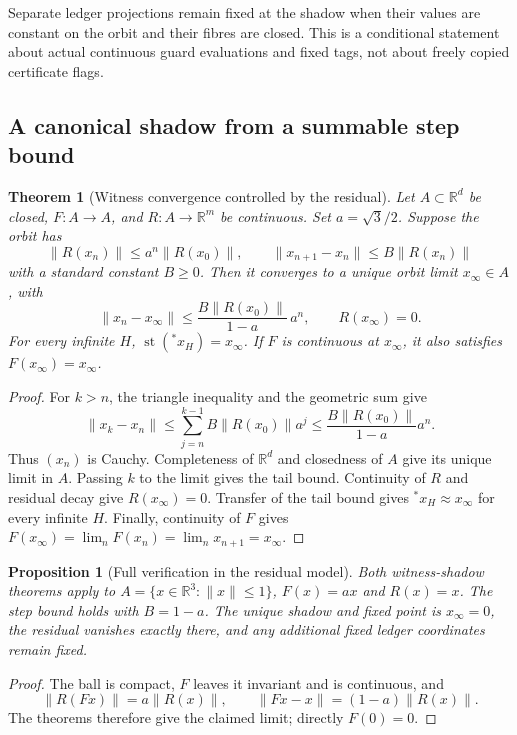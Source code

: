 \documentclass[11pt,a4paper]{article}
\newtheorem{proposition}{Proposition}
\newtheorem{theorem}{Theorem}
\begin{document}
Separate ledger projections remain fixed at the shadow when their values
are constant on the orbit and their fibres are closed. This is a conditional
statement about actual continuous guard evaluations and fixed tags, not
about freely copied certificate flags.

\subsection{A canonical shadow from a summable step bound}
\begin{theorem}[Witness convergence controlled by the residual]
\label{thm:canonical-witness-shadow}
Let $A\subset\mathbb R^d$ be closed, $F:A\to A$, and $R:A\to\mathbb R^m$
be continuous. Set $a=\sqrt3/2$. Suppose the orbit has
\[
\|R(x_n)\|\le a^n\|R(x_0)\|,
\qquad \|x_{n+1}-x_n\|\le B\|R(x_n)\|
\]
with a standard constant $B\ge0$. Then it converges to a unique orbit
limit $x_\infty\in A$, with
\[
\|x_n-x_\infty\|
\le\frac{B\|R(x_0)\|}{1-a}\,a^n,
\qquad R(x_\infty)=0.
\]
For every infinite $H$, $\operatorname{st}({}^*x_H)=x_\infty$.
If $F$ is continuous at $x_\infty$, it also satisfies
$F(x_\infty)=x_\infty$.
\end{theorem}
\begin{proof}
For $k>n$, the triangle inequality and the geometric sum give
\[
\|x_k-x_n\|
\le\sum_{j=n}^{k-1} B\|R(x_0)\|a^j
\le\frac{B\|R(x_0)\|}{1-a}a^n.
\]
Thus $(x_n)$ is Cauchy. Completeness of $\mathbb R^d$ and closedness of
$A$ give its unique limit in $A$. Passing $k$ to the limit gives the tail
bound. Continuity of $R$ and residual decay give $R(x_\infty)=0$.
Transfer of the tail bound gives ${}^*x_H\approx x_\infty$ for every
infinite $H$. Finally, continuity of $F$ gives
$F(x_\infty)=\lim_n F(x_n)=\lim_n x_{n+1}=x_\infty$.
\end{proof}

\begin{proposition}[Full verification in the residual model]
Both witness-shadow theorems apply to $A=\{x\in\mathbb R^3:\|x\|\le1\}$,
$F(x)=ax$ and $R(x)=x$. The step bound holds with $B=1-a$.
The unique shadow and fixed point is $x_\infty=0$, the residual vanishes
exactly there, and any additional fixed ledger coordinates remain fixed.
\end{proposition}
\begin{proof}
The ball is compact, $F$ leaves it invariant and is continuous, and
\[
\|R(Fx)\|=a\|R(x)\|,\qquad
\|Fx-x\|=(1-a)\|R(x)\|.
\]
The theorems therefore give the claimed limit; directly $F(0)=0$.
\end{proof}
\end{document}
